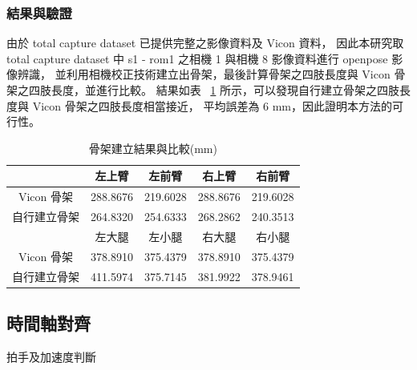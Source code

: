 \subsubsection{結果與驗證}
由於 total capture dataset 已提供完整之影像資料及 Vicon 資料，
因此本研究取 total capture dataset 中 s1 - rom1 之相機 1 與相機 8 影像資料進行 openpose 影像辨識，
並利用相機校正技術建立出骨架，最後計算骨架之四肢長度與 Vicon 骨架之四肢長度，並進行比較。
結果如表 ~\ref{ch3_skeleton_compare} 所示，可以發現自行建立骨架之四肢長度與 Vicon 骨架之四肢長度相當接近，
平均誤差為 6 mm，因此證明本方法的可行性。
\begin{table}[!ht]
   \caption[骨架建立結果與比較(mm)]{骨架建立結果與比較(mm)}
   \centering
   \label{ch3_skeleton_compare}
   \setlength{\tabcolsep}{3pt}
   \renewcommand\arraystretch{1.5}
   \begin{tabular}{c|c|c|c|c}
      & 左上臂 & 左前臂 & 右上臂 & 右前臂 \\
      \midrule
      Vicon 骨架 & 288.8676 & 219.6028 & 288.8676 & 219.6028 \\
      自行建立骨架 & 264.8320 & 254.6333 & 268.2862 & 240.3513 \\
      \midrule[2pt]
      & 左大腿 & 左小腿 & 右大腿 & 右小腿 \\
      \midrule
      Vicon 骨架 & 378.8910 & 375.4379 & 378.8910 & 375.4379 \\
      自行建立骨架 & 411.5974 & 375.7145 & 381.9922	& 378.9461 \\
   \end{tabular}
\end{table}

\subsection{時間軸對齊}
拍手及加速度判斷

